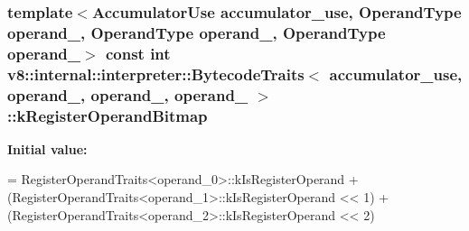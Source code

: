 \subsubsection[{\texorpdfstring{k\+Register\+Operand\+Bitmap}{kRegisterOperandBitmap}}]{\setlength{\rightskip}{0pt plus 5cm}template$<$Accumulator\+Use accumulator\+\_\+use, Operand\+Type operand\+\_, Operand\+Type operand\+\_, Operand\+Type operand\+\_$>$ const int {\bf v8\+::internal\+::interpreter\+::\+Bytecode\+Traits}$<$ accumulator\+\_\+use, operand\+\_, operand\+\_, operand\+\_ $>$\+::k\+Register\+Operand\+Bitmap\hspace{0.3cm}{\ttfamily [static]}}\hypertarget{structv8_1_1internal_1_1interpreter_1_1_bytecode_traits_3_01accumulator__use_00_01operand__0_00_7bc7f22e039a5dadb0419dc05f939673_ab055bbf8ac90d1c55f17c9e562bcabc0}{}\label{structv8_1_1internal_1_1interpreter_1_1_bytecode_traits_3_01accumulator__use_00_01operand__0_00_7bc7f22e039a5dadb0419dc05f939673_ab055bbf8ac90d1c55f17c9e562bcabc0}
{\bfseries Initial value\+:}
\begin{DoxyCode}
=
      RegisterOperandTraits<operand\_0>::kIsRegisterOperand +
      (RegisterOperandTraits<operand\_1>::kIsRegisterOperand << 1) +
      (RegisterOperandTraits<operand\_2>::kIsRegisterOperand << 2)
\end{DoxyCode}
